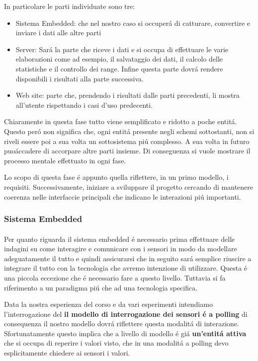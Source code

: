 In particolare le parti individuate sono tre:

\begin{itemize}
  \item Sistema Embedded: che nel nostro caso si occuper\'a di catturare, convertire e inviare i dati alle altre parti
  \item Server: Sar\'a la parte che riceve i dati e si occupa di effettuare le varie elaborazioni come ad esempio, il salvataggio dei dati, il calcolo delle statistiche e il controllo dei range. Infine questa parte dovr\'a rendere disponibili i risultati alla parte successiva.
  \item Web site: parte che, prendendo i risultati dalle parti precedenti, li mostra all'utente rispettando i casi d'uso predecenti.
\end{itemize}

Chiaramente in questa fase tutto viene semplificato e ridotto a poche entit\'a. Questo per\'o non significa che, ogni entit\'a presente negli schemi sottostanti, non si riveli essere poi a sua volta un sottosistema pi\'u complesso. A sua volta in futuro puo\' accadere di accorpare altre parti insieme. Di conseguenza si vuole mostrare il processo mentale effettuato in ogni fase.

Lo scopo di questa fase \'e appunto quella riflettere, in un primo modello, i requisiti. Successivamente, iniziare a sviluppare il progetto cercando di mantenere coerenza nelle interfaccie principali che indicano le interazioni pi\'u importanti.

\newpage

\subsubsection{Sistema Embedded}

\paragraph{}Per quanto riguarda il sistema embedded \'e necessario prima effettuare delle indagini su come interagire e comunicare con i sensori in modo da modellare adeguatamente il tutto e quindi assicurarsi che in seguito sar\'a semplice riuscire a integrare il tutto con la tecnologia che avremo intenzione di utilizzare. Questa \'e una piccola eccezione che \'e necessario fare a questo livello. Tuttavia si fa riferimento a un paradigma pi\'u che ad una tecnologia specifica.

Data la nostra esperienza del corso e da vari esperimenti intendiamo l'interrogazione del \textbf{il modello di interrogazione dei sensori \'e a polling} di consequenza il nostro modello dovr\'a riflettere questa modalit\'a di interazione. Sfortunatamente questo implica che a livello di modello \'e gi\'a \textbf{un'entit\'a attiva} che si occupa di reperire i valori visto, che in una modalit\'a a polling devo esplicitamente chiedere ai sensori i valori.

